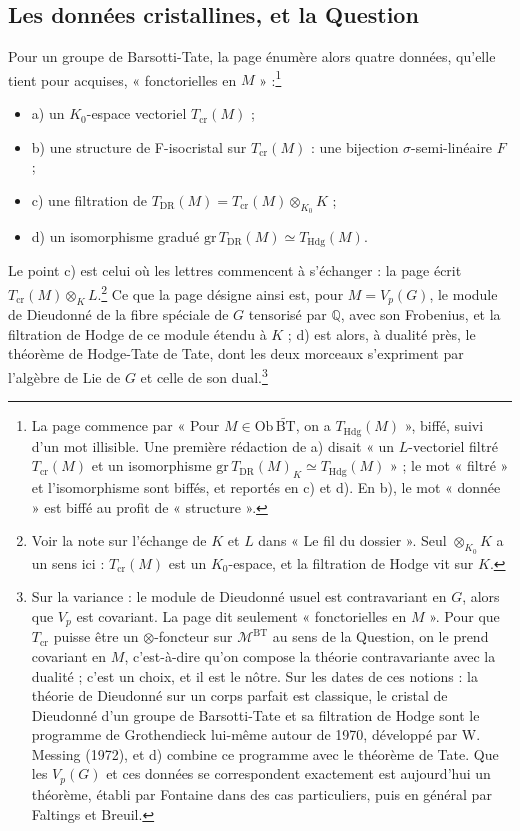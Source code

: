\documentclass[11pt,a4paper]{article}
\begin{document}
\subsection*{Les données cristallines, et la Question}

Pour un groupe de Barsotti-Tate, la page énumère alors quatre données, qu'elle
tient pour acquises, « fonctorielles en $M$ » :\footnote{La page commence par
« Pour $M \in \mathrm{Ob}\,\widetilde{\mathrm{BT}}$, on a
$T_{\mathrm{Hdg}}(M)$ », biffé, suivi d'un mot illisible. Une première
rédaction de a) disait « un $L$-vectoriel filtré $T_{\mathrm{cr}}(M)$ et un
isomorphisme $\mathrm{gr}\, T_{\mathrm{DR}}(M)_K \simeq T_{\mathrm{Hdg}}(M)$ » ;
le mot « filtré » et l'isomorphisme sont biffés, et reportés en c) et d). En
b), le mot « donnée » est biffé au profit de « structure ».}

\begin{itemize}
  \item a) un $K_0$-espace vectoriel $T_{\mathrm{cr}}(M)$ ;
  \item b) une structure de F-isocristal sur $T_{\mathrm{cr}}(M)$ : une
  bijection $\sigma$-semi-linéaire $F$ ;
  \item c) une filtration de $T_{\mathrm{DR}}(M) = T_{\mathrm{cr}}(M)
  \otimes_{K_0} K$ ;
  \item d) un isomorphisme gradué $\mathrm{gr}\, T_{\mathrm{DR}}(M) \simeq
  T_{\mathrm{Hdg}}(M)$.
\end{itemize}

Le point c) est celui où les lettres commencent à s'échanger : la page écrit
$T_{\mathrm{cr}}(M) \otimes_K L$.\footnote{Voir la note sur l'échange de $K$
et $L$ dans « Le fil du dossier ». Seul $\otimes_{K_0} K$ a un sens ici :
$T_{\mathrm{cr}}(M)$ est un $K_0$-espace, et la filtration de Hodge vit sur
$K$.} Ce que la page désigne ainsi est, pour $M = V_p(G)$, le module de
Dieudonné de la fibre spéciale de $G$ tensorisé par $\mathbb{Q}$, avec son
Frobenius, et la filtration de Hodge de ce module étendu à $K$ ; d) est alors,
à dualité près, le théorème de Hodge-Tate de Tate, dont les deux morceaux
s'expriment par l'algèbre de Lie de $G$ et celle de son dual.\footnote{Sur la
variance : le module de Dieudonné usuel est contravariant en $G$, alors que
$V_p$ est covariant. La page dit seulement « fonctorielles en $M$ ». Pour que
$T_{\mathrm{cr}}$ puisse être un $\otimes$-foncteur sur
$\mathcal{M}^{\mathrm{BT}}$ au sens de la Question, on le prend covariant en
$M$, c'est-à-dire qu'on compose la théorie contravariante avec la dualité ;
c'est un choix, et il est le nôtre. Sur les dates de ces notions : la
théorie de Dieudonné sur un corps parfait est classique, le cristal de
Dieudonné d'un groupe de Barsotti-Tate et sa filtration de Hodge sont le
programme de Grothendieck lui-même autour de 1970, développé par W. Messing
(1972), et d) combine ce programme avec le théorème de Tate. Que les $V_p(G)$
et ces données se correspondent exactement est aujourd'hui un théorème, établi
par Fontaine dans des cas particuliers, puis en général par Faltings et
Breuil.}
\end{document}
